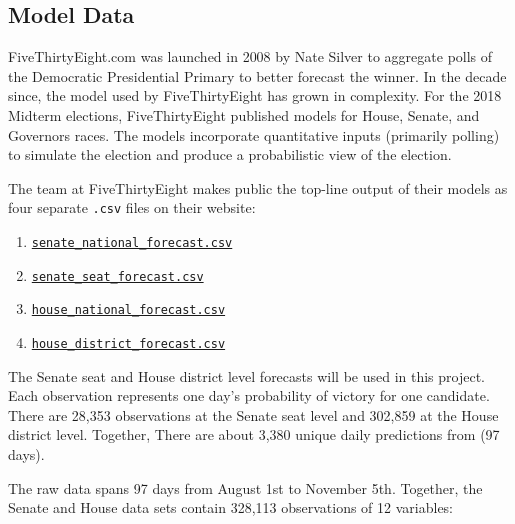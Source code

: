 \documentclass[]{article}
\providecommand{\tightlist}{%
  \setlength{\itemsep}{0pt}\setlength{\parskip}{0pt}}
\begin{document}
\subsection{Model Data}\label{model-data}

FiveThirtyEight.com was launched in 2008 by Nate Silver to aggregate
polls of the Democratic Presidential Primary to better forecast the
winner. In the decade since, the model used by FiveThirtyEight has grown
in complexity. For the 2018 Midterm elections, FiveThirtyEight published
models for House, Senate, and Governors races. The models incorporate
quantitative inputs (primarily polling) to simulate the election and
produce a probabilistic view of the election.

The team at FiveThirtyEight makes public the top-line output of their
models as four separate \texttt{.csv} files on their website:

\begin{enumerate}
\def\labelenumi{\arabic{enumi}.}
\tightlist
\item
  \href{https://projects.fivethirtyeight.com/congress-model-2018/senate_national_forecast.csv}{\texttt{senate\_national\_forecast.csv}}
\item
  \href{https://projects.fivethirtyeight.com/congress-model-2018/senate_seat_forecast.csv}{\texttt{senate\_seat\_forecast.csv}}
\item
  \href{https://projects.fivethirtyeight.com/congress-model-2018/house_national_forecast.csv}{\texttt{house\_national\_forecast.csv}}
\item
  \href{https://projects.fivethirtyeight.com/congress-model-2018/house_district_forecast.csv}{\texttt{house\_district\_forecast.csv}}
\end{enumerate}

The Senate seat and House district level forecasts will be used in this
project. Each observation represents one day's probability of victory
for one candidate. There are 28,353 observations at the Senate seat
level and 302,859 at the House district level. Together, There are about
3,380 unique daily predictions from (97 days).

The raw data spans 97 days from August 1st to November 5th. Together,
the Senate and House data sets contain 328,113 observations of 12
variables:
\end{document}
